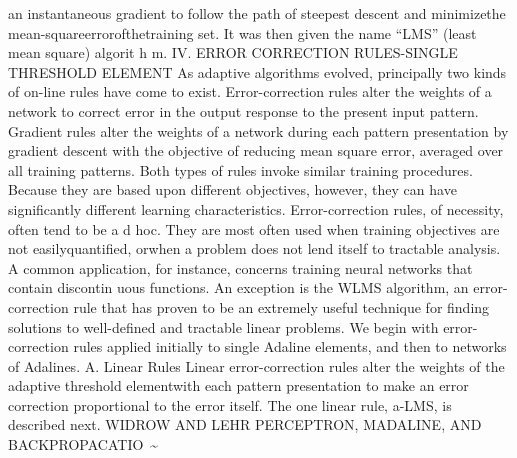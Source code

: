 \documentclass[11pt,a4paper,twocolumn]{article}
\begin{document}
an instantaneous gradient to follow the path of steepest 
descent and minimizethe mean-squareerrorofthetraining 
set. It was then given the name “LMS” (least mean square) 
algorit h m. 
IV. ERROR CORRECTION 
RULES-SINGLE THRESHOLD 
ELEMENT 
As adaptive algorithms evolved, principally two kinds of 
on-line rules have come to exist. Error-correction rules alter 
the weights of a network to correct error in the output 
response to the present input pattern. Gradient rules alter 
the weights of a network during each pattern presentation 
by gradient descent with the objective of reducing mean
square error, averaged over all training patterns. Both types 
of rules invoke similar training procedures. Because they 
are based upon different objectives, however, they can have 
significantly different learning characteristics. 
Error-correction rules, of necessity, often tend to be a d  
hoc. They are most often used when training objectives are 
not easilyquantified, orwhen a problem does not lend itself 
to tractable analysis. A common application, for instance, 
concerns training neural networks that contain discontin
uous functions. An exception is the WLMS algorithm, an 
error-correction rule that has proven to be an extremely 
useful technique for finding solutions to well-defined and 
tractable linear problems. 
We begin with error-correction rules applied initially to 
single Adaline elements, and then to networks of Adalines. 
A. Linear Rules 
Linear error-correction rules alter the weights of the 
adaptive threshold elementwith each pattern presentation 
to make an error correction proportional to the error itself. 
The one linear rule, a-LMS, is described next. 
WIDROW AND LEHR PERCEPTRON, MADALINE, AND BACKPROPACATIO\ 
\~{} 






\newpage

\end{document}

